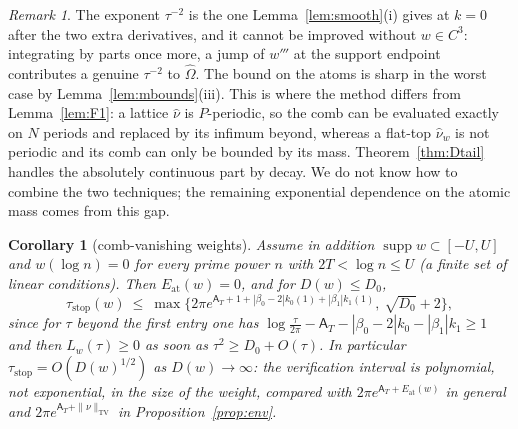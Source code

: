 \documentclass[11pt]{amsart}
\newtheorem{corollary}[theorem]{Corollary}
\theoremstyle{definition}
\theoremstyle{remark}
\newtheorem{remark}[theorem]{Remark}
\newcommand{\supp}{\operatorname{supp}}
\newcommand{\TV}{\operatorname{TV}}
\newcommand{\nuh}{\widehat\nu}
\newcommand{\Aconst}{\mathsf A_T}
\begin{document}
\begin{remark}\label{rem:Dgrade}
The exponent $\tau^{-2}$ is the one Lemma~\ref{lem:smooth}(i) gives at $k=0$ after the two extra
derivatives, and it cannot be improved without $w\in C^3$: integrating by parts once more, a jump of
$w'''$ at the support endpoint contributes a genuine $\tau^{-2}$ to $\widehat\Omega$. The bound on
the atoms is sharp in the worst case by Lemma~\ref{lem:mbounds}(iii). This is where the method
differs from Lemma~\ref{lem:F1}: a lattice $\nuh$ is $P$-periodic, so the comb can be evaluated
exactly on $N$ periods and replaced by its infimum beyond, whereas a flat-top $\nuh_w$ is not
periodic and its comb can only be bounded by its mass. Theorem~\ref{thm:Dtail} handles the absolutely
continuous part by decay. We do not know how to combine the two techniques; the remaining
exponential dependence on the atomic mass comes from this gap.
\end{remark}

\begin{corollary}[comb-vanishing weights]\label{cor:comb}
Assume in addition $\supp w\subset[-U,U]$ and $w(\log n)=0$ for every prime power $n$ with
$2T<\log n\le U$ (a finite set of linear conditions). Then $E_{\mathrm{at}}(w)=0$, and for
$D(w)\le D_0$,
\[
\tau_{\mathrm{stop}}(w)\ \le\ \max\Big\{2\pi e^{\Aconst+1+|\beta_0-2|k_0(1)+|\beta_1|k_1(1)},\ \sqrt{D_0}+2\Big\},
\]
since for $\tau$ beyond the first entry one has $\log\frac\tau{2\pi}-\Aconst-|\beta_0-2|k_0-|\beta_1|k_1\ge1$
and then $L_w(\tau)\ge0$ as soon as $\tau^2\ge D_0+O(\tau)$. In particular
$\tau_{\mathrm{stop}}=O(D(w)^{1/2})$ as $D(w)\to\infty$: the verification interval is polynomial,
not exponential, in the size of the weight, compared with $2\pi e^{\Aconst+E_{\mathrm{at}}(w)}$ in
general and $2\pi e^{\Aconst+\|\nu\|_{\TV}}$ in Proposition~\ref{prop:env}.
\end{corollary}
\end{document}
